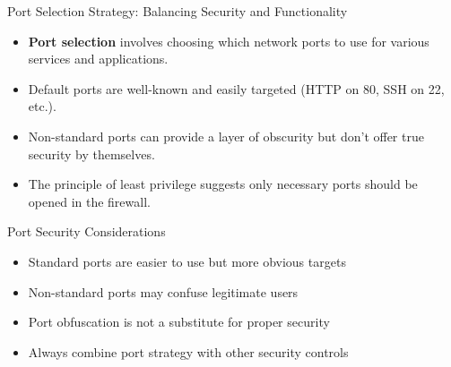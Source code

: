 \documentclass{beamer}
\begin{document}
                \begin{frame}{Port Selection Strategy: Balancing Security and Functionality}
                \begin{itemize}
                    \item \textbf{Port selection} involves choosing which network ports to use for various services and applications.
                    \item Default ports are well-known and easily targeted (HTTP on 80, SSH on 22, etc.).
                    \item Non-standard ports can provide a layer of obscurity but don't offer true security by themselves.
                    \item The principle of least privilege suggests only necessary ports should be opened in the firewall.
                \end{itemize}
                
                \begin{block}{Port Security Considerations}
                \begin{itemize}
                    \item Standard ports are easier to use but more obvious targets
                    \item Non-standard ports may confuse legitimate users
                    \item Port obfuscation is not a substitute for proper security
                    \item Always combine port strategy with other security controls
                \end{itemize}
                \end{block}
                \end{frame}
                
\end{document}
